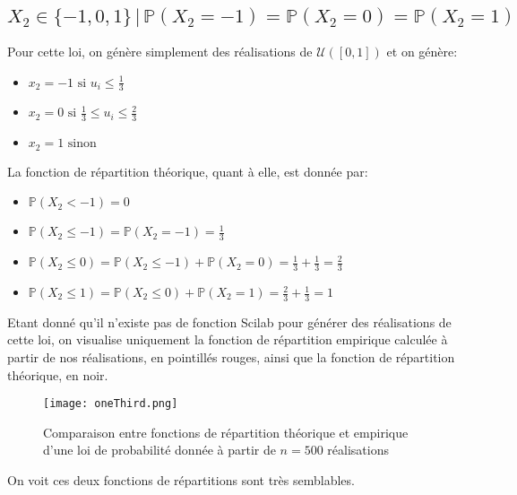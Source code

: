 \documentclass{article}
\begin{document}
\begin{multicols}{2}
\subsection{$X_2 \in \{-1, 0, 1\} \,|\, \mathbb{P}(X_2 = -1) = \mathbb{P}(X_2 = 0) = \mathbb{P}(X_2 = 1)$}\label{subsec:ex22}

Pour cette loi, on génère simplement des réalisations de $\mathcal{U}([0, 1])$
et on génère:

\begin{itemize}
    \item $x_2 = -1 \text{ si } u_i \leq \frac{1}{3}$
    \item $x_2 = 0  \text{ si } \frac{1}{3} \leq u_i \leq \frac{2}{3}$
    \item $x_2 = 1  \text{ sinon}$
\end{itemize}

La fonction de répartition théorique, quant à elle, est donnée par:

\begin{itemize}
    \item $\mathbb{P}(X_2 < -1) = 0$
    \item $\mathbb{P}(X_2 \leq -1) = \mathbb{P}(X_2 = -1) = \frac{1}{3}$
    \item $\mathbb{P}(X_2 \leq 0) = \mathbb{P}(X_2 \leq -1) +
        \mathbb{P}(X_2 = 0) = \frac{1}{3} + \frac{1}{3} = \frac{2}{3}$
    \item $\mathbb{P}(X_2 \leq 1) = \mathbb{P}(X_2 \leq 0) + \mathbb{P}(X_2 = 1)
        = \frac{2}{3} + \frac{1}{3} = 1$
\end{itemize}

Etant donné qu'il n'existe pas de fonction Scilab pour générer des réalisations
de cette loi, on visualise uniquement la fonction de répartition empirique
calculée à partir de nos réalisations, en pointillés rouges, ainsi que la
fonction de répartition théorique, en noir.

\begin{figure}[H]
    \begin{center}
        \texttt{[image: oneThird.png]}
        \centering
        \captionsetup{justification=centering}
        \caption{\label{fig:oneThird}Comparaison entre fonctions de répartition théorique et empirique d'une loi de probabilité donnée à partir de $n = 500$ réalisations}
    \end{center}
\end{figure}

On voit ces deux fonctions de répartitions sont très semblables.


\end{multicols}
\end{document}
